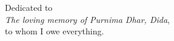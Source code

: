 \thispagestyle{empty}
{}

\vspace*{6cm}

\begin{center}
    Dedicated to \\
    \emph{The loving memory of Purnima Dhar, Dida},\\
    to whom I owe everything.
\end{center}

\medskip
